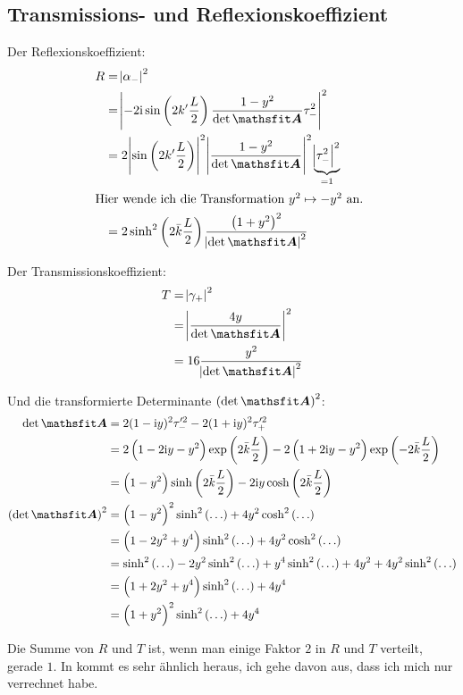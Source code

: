\subsection{Transmissions- und Reflexionskoeffizient}

Der Reflexionskoeffizient:
\begin{align*}
	R
	&= \abs{\alpha_-}^2 \\
	&= \abs{-2 \ii \sin\del{2 k' \frac L2} \frac{1-y^2}{\detA} \tau_-^2}^2 \\
	&= 2 \abs{\sin\del{2 k' \frac L2}}^2 \abs{\frac{1-y^2}{\detA}}^2 \underbrace{\abs{\tau_-^2}^2}_{=1} \\
	\intertext{%
		Hier wende ich die Transformation $y^2 \mapsto - y^2$ an.
	}
	&= 2 \sinh^2\del{2 \bar k \frac L2} \frac{\del{1+y^2}^2}{\abs{\detA}^2}
\end{align*}

Der Transmissionskoeffizient:
\begin{align*}
	T
	&= \abs{\gamma_+}^2 \\
	&= \abs{\frac{4y}\detA}^2 \\
	&= 16 \frac{y^2}{\abs{\detA}^2}
\end{align*}

Und die transformierte Determinante $\del{\detA}^2$:
\begin{align*}
	\detA
	&= 2 (1-\ii y)^2 \tau_-^{\prime2} - 2(1+\ii y)^2 \tau_+^{\prime2} \\
	&= 2 \del{1 - 2\ii y - y^2} \exp\del{2 \bar k \frac L2} - 2 \del{1 + 2\ii y - y^2} \exp\del{- 2 \bar k \frac L2} \\
	&= \del{1-y^2} \sinh\del{2 \bar k \frac L2} - 2 \ii y \cosh\del{2 \bar k \frac L2} \\
	\del\detA^2
	&= \del{1-y^2}^2 \sinh^2\del\ldots + 4 y^2 \cosh^2\del\ldots \\
	&= \del{1-2y^2+y^4} \sinh^2\del\ldots + 4 y^2 \cosh^2\del\ldots \\
	&= \sinh^2\del\ldots - 2 y^2\sinh^2\del\ldots + y^4 \sinh^2\del\ldots + 4 y^2 + 4 y^2 \sinh^2\del\ldots \\
	&= \del{1 + 2 y^2 + y^4} \sinh^2\del\ldots + 4 y^4 \\
	&= \del{1 + y^2}^2 \sinh^2\del\ldots + 4 y^4
\end{align*}

Die Summe von $R$ und $T$ ist, wenn man einige Faktor $2$ in $R$ und $T$
verteilt, gerade $1$. In \cite[Seite 283]{nolting-theo5} kommt es sehr ähnlich
heraus, ich gehe davon aus, dass ich mich nur verrechnet habe.

